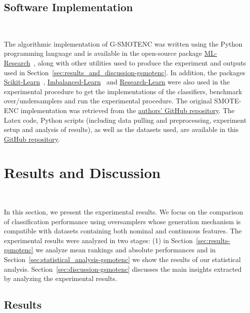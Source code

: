 \subsection{Software Implementation}~\label{sec:software_implementation-gsmotenc}

The algorithmic implementation of G-SMOTENC was written using the Python
programming language and is available in the open-source package
\href{https://github.com/joaopfonseca/ml-research}{ML-Research}~\cite{Fonseca2021al},
along with other utilities used to produce the experiment and outputs used in
Section~\ref{sec:results_and_discussion-gsmotenc}. In addition, the packages
\href{https://github.com/scikit-learn/scikit-learn/}{Scikit-Learn}~\cite{Pedregosa2011},
\href{https://github.com/scikit-learn-contrib/imbalanced-learn}{Imbalanced-Learn}~\cite{JMLR:v18:16-365}
and \href{https://github.com/georgedouzas/research-learn/}{Research-Learn}
were also used in the experimental procedure to get the implementations of the
classifiers, benchmark over/undersamplers and run the experimental procedure.
The original SMOTE-ENC implementation was retrieved from the
\href{https://github.com/Mimimkh/SMOTE-ENC-code}{authors' GitHub repository}.
The Latex code, Python scripts (including data pulling and preprocessing,
experiment setup and analysis of results), as well as the datasets used, are
available in this \href{https://github.com/joaopfonseca/publications}{GitHub
repository}.
 
\section{Results and Discussion}~\label{sec:results_and_discussion-gsmotenc}

In this section, we present the experimental results. We focus on the
comparison of classification performance using oversamplers whose generation
mechanism is compatible with datasets containing both nominal and continuous
features. The experimental results were analyzed in two stages: (1) in
Section~\ref{sec:results-gsmotenc} we analyze mean rankings and absolute performances
and in Section~\ref{sec:statistical_analysis-gsmotenc} we show the results of our
statistical analysis. Section~\ref{sec:discussion-gsmotenc} discusses the main
insights extracted by analyzing the experimental results.

\subsection{Results}~\label{sec:results-gsmotenc}

